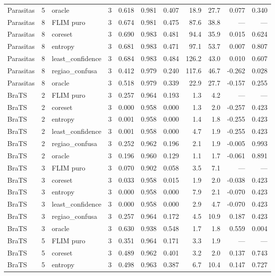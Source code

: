 \begin{tabular}{lllrrrrrrrr}
Parasitas & 5 & oracle & 3 & 0.618 & 0.981 & 0.407 & 18.9 & 27.7 & 0.077 & 0.340 \\
Parasitas & 8 & FLIM puro & 3 & 0.674 & 0.981 & 0.475 & 87.6 & 38.8 & --- & --- \\
Parasitas & 8 & coreset & 3 & 0.690 & 0.983 & 0.481 & 94.4 & 35.9 & 0.015 & 0.624 \\
Parasitas & 8 & entropy & 3 & 0.681 & 0.983 & 0.471 & 97.1 & 53.7 & 0.007 & 0.807 \\
Parasitas & 8 & least\_confidence & 3 & 0.684 & 0.983 & 0.484 & 126.2 & 43.0 & 0.010 & 0.607 \\
Parasitas & 8 & regiao\_confusa & 3 & 0.412 & 0.979 & 0.240 & 117.6 & 46.7 & -0.262 & 0.028 \\
Parasitas & 8 & oracle & 3 & 0.518 & 0.979 & 0.339 & 22.9 & 27.7 & -0.157 & 0.255 \\
BraTS & 2 & FLIM puro & 3 & 0.257 & 0.964 & 0.193 & 1.3 & 4.2 & --- & --- \\
BraTS & 2 & coreset & 3 & 0.000 & 0.958 & 0.000 & 1.3 & 2.0 & -0.257 & 0.423 \\
BraTS & 2 & entropy & 3 & 0.001 & 0.958 & 0.000 & 1.4 & 1.8 & -0.255 & 0.423 \\
BraTS & 2 & least\_confidence & 3 & 0.001 & 0.958 & 0.000 & 4.7 & 1.9 & -0.255 & 0.423 \\
BraTS & 2 & regiao\_confusa & 3 & 0.252 & 0.962 & 0.196 & 2.1 & 1.9 & -0.005 & 0.993 \\
BraTS & 2 & oracle & 3 & 0.196 & 0.960 & 0.129 & 1.1 & 1.7 & -0.061 & 0.891 \\
BraTS & 3 & FLIM puro & 3 & 0.070 & 0.902 & 0.058 & 3.5 & 7.1 & --- & --- \\
BraTS & 3 & coreset & 3 & 0.033 & 0.958 & 0.015 & 1.9 & 2.0 & -0.038 & 0.423 \\
BraTS & 3 & entropy & 3 & 0.000 & 0.958 & 0.000 & 7.9 & 2.1 & -0.070 & 0.423 \\
BraTS & 3 & least\_confidence & 3 & 0.000 & 0.958 & 0.000 & 2.9 & 4.7 & -0.070 & 0.423 \\
BraTS & 3 & regiao\_confusa & 3 & 0.257 & 0.964 & 0.172 & 4.5 & 10.9 & 0.187 & 0.423 \\
BraTS & 3 & oracle & 3 & 0.630 & 0.938 & 0.548 & 1.7 & 1.8 & 0.559 & 0.004 \\
BraTS & 5 & FLIM puro & 3 & 0.351 & 0.964 & 0.171 & 3.3 & 1.9 & --- & --- \\
BraTS & 5 & coreset & 3 & 0.489 & 0.962 & 0.401 & 3.2 & 2.0 & 0.137 & 0.743 \\
BraTS & 5 & entropy & 3 & 0.498 & 0.963 & 0.387 & 6.7 & 10.4 & 0.147 & 0.727 \\

\end{tabular}

